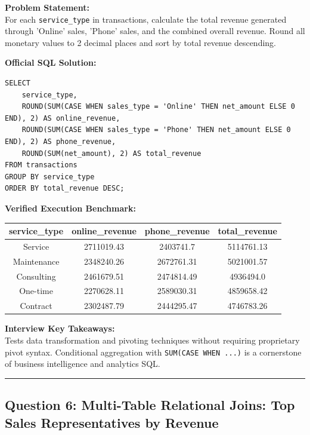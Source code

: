 \documentclass[11pt,a4paper]{article}
\begin{document}
\vspace{0.15cm}
\noindent\textbf{Problem Statement:} \\
For each \texttt{service\_type} in transactions, calculate the total revenue generated through 'Online' sales, 'Phone' sales, and the combined overall revenue. Round all monetary values to 2 decimal places and sort by total revenue descending.

\vspace{0.25cm}
\noindent\textbf{Official SQL Solution:}
\begin{verbatim}
SELECT 
    service_type,
    ROUND(SUM(CASE WHEN sales_type = 'Online' THEN net_amount ELSE 0 END), 2) AS online_revenue,
    ROUND(SUM(CASE WHEN sales_type = 'Phone' THEN net_amount ELSE 0 END), 2) AS phone_revenue,
    ROUND(SUM(net_amount), 2) AS total_revenue
FROM transactions
GROUP BY service_type
ORDER BY total_revenue DESC;
\end{verbatim}

\vspace{0.15cm}
\noindent\textbf{Verified Execution Benchmark:}
\begin{center}
\small
\begin{tabular}{cccc}
\toprule
\textbf{service\_type} & \textbf{online\_revenue} & \textbf{phone\_revenue} & \textbf{total\_revenue} \\
\midrule
Service & 2711019.43 & 2403741.7 & 5114761.13 \\
Maintenance & 2348240.26 & 2672761.31 & 5021001.57 \\
Consulting & 2461679.51 & 2474814.49 & 4936494.0 \\
One-time & 2270628.11 & 2589030.31 & 4859658.42 \\
Contract & 2302487.79 & 2444295.47 & 4746783.26 \\
\bottomrule
\end{tabular}
\end{center}

\vspace{0.15cm}
\noindent\textbf{Interview Key Takeaways:} \\
Tests data transformation and pivoting techniques without requiring proprietary pivot syntax. Conditional aggregation with \texttt{SUM(CASE WHEN ...)} is a cornerstone of business intelligence and analytics SQL.

\vspace{0.4cm}
\noindent\rule{\textwidth}{0.4pt}
\vspace{0.4cm}

\subsection*{Question 6: Multi-Table Relational Joins: Top Sales Representatives by Revenue}
\end{document}
